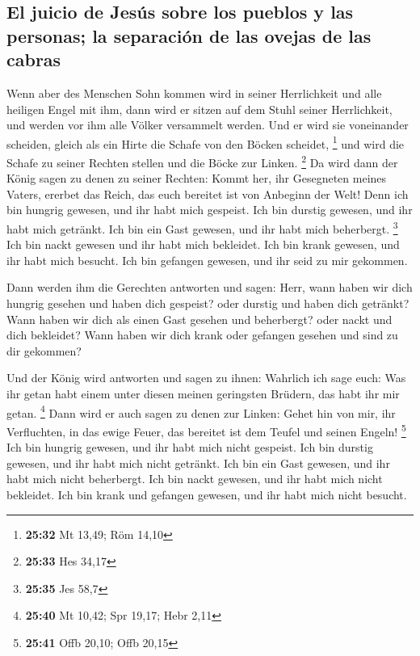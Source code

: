 \hypertarget{el-juicio-de-jesuxfas-sobre-los-pueblos-y-las-personas-la-separaciuxf3n-de-las-ovejas-de-las-cabras}{%
\subsection{El juicio de Jesús sobre los pueblos y las personas; la
separación de las ovejas de las
cabras}\label{el-juicio-de-jesuxfas-sobre-los-pueblos-y-las-personas-la-separaciuxf3n-de-las-ovejas-de-las-cabras}}

 Wenn aber des Menschen Sohn kommen wird in seiner
Herrlichkeit und alle heiligen Engel mit ihm, dann wird er sitzen auf
dem Stuhl seiner Herrlichkeit,  und werden vor ihm alle
Völker versammelt werden. Und er wird sie voneinander scheiden, gleich
als ein Hirte die Schafe von den Böcken scheidet, \footnote{\textbf{25:32}
  Mt 13,49; Röm 14,10}  und wird die Schafe zu seiner
Rechten stellen und die Böcke zur Linken. \footnote{\textbf{25:33} Hes
  34,17}  Da wird dann der König sagen zu denen zu seiner
Rechten: Kommt her, ihr Gesegneten meines Vaters, ererbet das Reich, das
euch bereitet ist von Anbeginn der Welt!  Denn ich bin
hungrig gewesen, und ihr habt mich gespeist. Ich bin durstig gewesen,
und ihr habt mich getränkt. Ich bin ein Gast gewesen, und ihr habt mich
beherbergt. \footnote{\textbf{25:35} Jes 58,7}  Ich bin
nackt gewesen und ihr habt mich bekleidet. Ich bin krank gewesen, und
ihr habt mich besucht. Ich bin gefangen gewesen, und ihr seid zu mir
gekommen.

 Dann werden ihm die Gerechten antworten und sagen: Herr,
wann haben wir dich hungrig gesehen und haben dich gespeist? oder
durstig und haben dich getränkt?  Wann haben wir dich als
einen Gast gesehen und beherbergt? oder nackt und dich bekleidet?
 Wann haben wir dich krank oder gefangen gesehen und sind
zu dir gekommen?

 Und der König wird antworten und sagen zu ihnen:
Wahrlich ich sage euch: Was ihr getan habt einem unter diesen meinen
geringsten Brüdern, das habt ihr mir getan. \footnote{\textbf{25:40} Mt
  10,42; Spr 19,17; Hebr 2,11}  Dann wird er auch sagen
zu denen zur Linken: Gehet hin von mir, ihr Verfluchten, in das ewige
Feuer, das bereitet ist dem Teufel und seinen Engeln! \footnote{\textbf{25:41}
  Offb 20,10; Offb 20,15}  Ich bin hungrig gewesen, und
ihr habt mich nicht gespeist. Ich bin durstig gewesen, und ihr habt mich
nicht getränkt.  Ich bin ein Gast gewesen, und ihr habt
mich nicht beherbergt. Ich bin nackt gewesen, und ihr habt mich nicht
bekleidet. Ich bin krank und gefangen gewesen, und ihr habt mich nicht
besucht.

